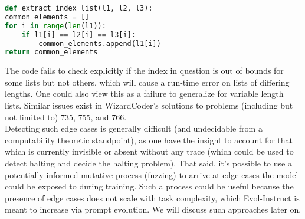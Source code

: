 \documentclass[10pt]{article}
\theoremstyle{definition}
\begin{document}
\begin{lstlisting}[language=Python]
def extract_index_list(l1, l2, l3):
common_elements = []
for i in range(len(l1)):
    if l1[i] == l2[i] == l3[i]:
        common_elements.append(l1[i])
return common_elements
\end{lstlisting}
\noindent The code fails to check explicitly if the index in question is out of bounds for some lists but not others, which will cause a run-time error on lists of differing lengths. One could also view this as a failure to generalize for variable length lists. Similar issues exist in WizardCoder's solutions to problems (including but not limited to) 735, 755, and 766.\\

\noindent Detecting such edge cases is generally difficult (and undecidable from a computability theoretic standpoint), as one have the insight to account for that which is currently invisible or absent without any trace (which could be used to detect halting and decide the halting problem). That said, it's possible to use a potentially informed mutative process (fuzzing) to arrive at edge cases the model could be exposed to during training. Such a process could be useful because the presence of edge cases does not scale with task complexity, which Evol-Instruct is meant to increase via prompt evolution. We will discuss such approaches later on.
\end{document}
